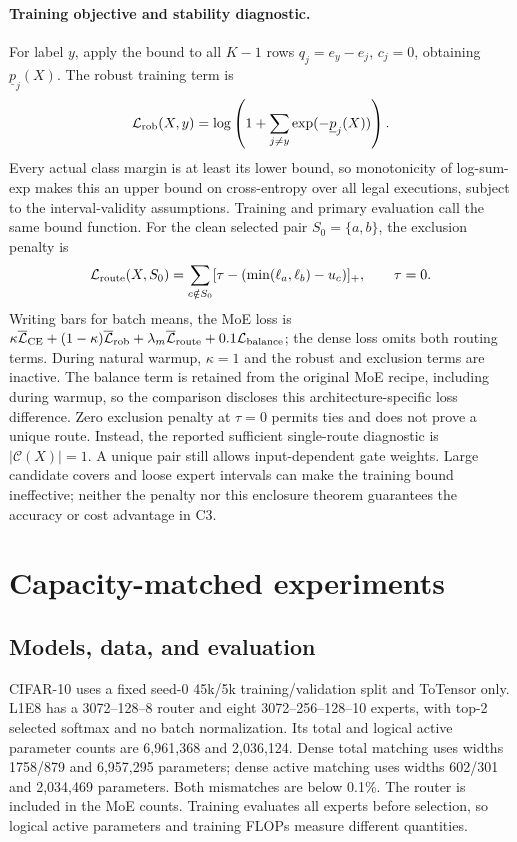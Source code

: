 \documentclass[10pt]{article}
\begin{document}
\paragraph{Training objective and stability diagnostic.}
For label $y$, apply the bound to all $K-1$ rows $q_j=e_y-e_j$, $c_j=0$,
obtaining $\underline p_j(X)$. The robust training term is
\[
 \mathcal L_{\rm rob}(X,y)=
 \log\left(1+\sum_{j\ne y}\exp(-\underline p_j(X))\right).
\]
Every actual class margin is at least its lower bound, so monotonicity of
log-sum-exp makes this an upper bound on cross-entropy over all legal
executions, subject to the interval-validity assumptions. Training and primary
evaluation call the same bound function.
For the clean selected pair $S_0=\{a,b\}$, the exclusion penalty is
\[
 \mathcal L_{\rm route}(X,S_0)=
 \sum_{c\notin S_0}
 [\tau-(\min(\ell_a,\ell_b)-u_c)]_+,\qquad\tau=0.
\]
Writing bars for batch means, the MoE loss is
$\kappa\overline{\mathcal L}_{\rm CE}+(1-\kappa)\overline{\mathcal L}_{\rm rob}
+\lambda_m\overline{\mathcal L}_{\rm route}+0.1\mathcal L_{\rm balance}$;
the dense loss omits both routing terms. During natural warmup, $\kappa=1$
and the robust and exclusion terms are inactive. The balance term is retained
from the original MoE recipe, including during warmup, so the comparison
discloses this architecture-specific loss difference.
Zero exclusion penalty at $\tau=0$ permits ties and does not prove a unique
route. Instead, the reported sufficient single-route diagnostic is
$|\mathcal C(X)|=1$. A unique pair still allows input-dependent gate weights.
Large candidate covers and loose expert intervals can make the training
bound ineffective; neither the penalty nor this enclosure theorem guarantees
the accuracy or cost advantage in C3.


\section{Capacity-matched experiments}
\label{sec:experiments}
\subsection{Models, data, and evaluation}
CIFAR-10 uses a fixed seed-0 45k/5k training/validation split and ToTensor only.
L1E8 has a 3072--128--8 router and eight 3072--256--128--10 experts, with top-2
selected softmax and no batch normalization. Its total and logical active
parameter counts are 6,961,368 and 2,036,124. Dense total matching uses widths
1758/879 and 6,957,295 parameters; dense active matching uses widths 602/301
and 2,034,469 parameters. Both mismatches are below 0.1\%. The router is
included in the MoE counts. Training evaluates all experts before selection,
so logical active parameters and training FLOPs measure different quantities.
\end{document}
